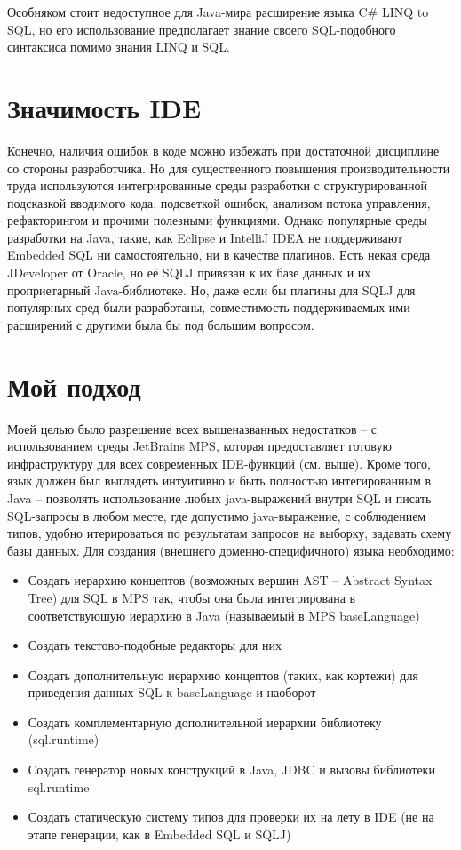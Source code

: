 \documentclass[12pt]{article}
\begin{document}
Особняком стоит недоступное для Java-мира расширение языка C\# LINQ to SQL, но его использование предполагает знание своего SQL-подобного синтаксиса помимо знания LINQ и SQL.\\

\section{Значимость IDE}
Конечно, наличия ошибок в коде можно избежать при достаточной дисциплине со стороны разработчика. Но для существенного повышения производительности труда используются интегрированные среды разработки с структурированной подсказкой вводимого кода, подсветкой ошибок, анализом потока управления, рефакторингом и прочими полезными функциями. Однако популярные среды разработки на Java, такие, как Eclipse и IntelliJ IDEA не поддерживают Embedded SQL ни самостоятельно, ни в качестве плагинов. Есть некая среда JDeveloper от Oracle, но её SQLJ привязан к их базе данных и их проприетарный Java-библиотеке. Но, даже если бы плагины для SQLJ для популярных сред были разработаны, совместимость поддерживаемых ими расширений с другими была бы под большим вопросом.

\section{Мой подход}
Моей целью было разрешение всех вышеназванных недостатков -- с использованием среды JetBrains MPS, которая предоставляет готовую инфраструктуру для всех современных IDE-функций (см. выше). Кроме того, язык должен был выглядеть интуитивно и быть полностью интегированным в Java -- позволять использование любых java-выражений внутри SQL и писать SQL-запросы в любом месте, где допустимо java-выражение, с соблюдением типов, удобно итерироваться по результатам запросов на выборку, задавать схему базы данных. Для создания (внешнего доменно-специфичного) языка необходимо:
\begin{itemize}
\item Создать иерархию концептов (возможных вершин AST -- Abstract Syntax Tree) для SQL в MPS так, чтобы она была интегрирована в соответствуюшую иерархию в Java (называемый в MPS baseLanguage)
\item Создать текстово-подобные редакторы для них
\item Создать дополнительную иерархию концептов (таких, как кортежи) для приведения данных SQL к baseLanguage и наоборот
\item Создать комплементарную дополнительной иерархии библиотеку (sql.runtime)
\item Создать генератор новых конструкций в Java, JDBC и вызовы библиотеки sql.runtime
\item Создать статическую систему типов для проверки их на лету в IDE (не на этапе генерации, как в Embedded SQL и SQLJ)
\end{itemize}
\end{document}
